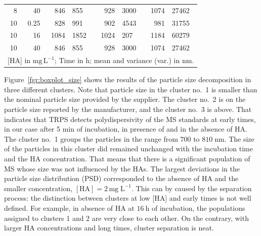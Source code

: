 \documentclass[journal=langd5,manuscript=article]{achemso}
\begin{document}
\begin{table}
\begin{tabular}{r r  
r@{$\;\pm$}l  
r@{$\;\pm$}l  
r@{$\;\pm$}l }
  8      &     40         &    846       & 855      &    928      &   3000      & 1074      &  27462     \\ 
  10     &      0.25      &    828       & 991      &    902      &   4543      & 981      &  31755     \\ 
  10     &     16         &   1084       & 1852      &   1024      &    207      & 1184      &  60279     \\ 
  10     &     40         &    846       & 855      &    928      &   3000      & 1074      &  27462     \\ 
\hline
\multicolumn{8}{l}{[HA] in $\mathrm{mg\,L^{-1}}$; Time in $\mathrm{h}$; mean and variance (var.) in $\mathrm{nm}$.} 
\end{tabular}
\end{table}



Figure~\ref{fgr:boxplot_size} shows the results of the particle size decomposition in three different clusters. Note that particle size in the cluster no.~1 is smaller than the nominal particle size provided by the supplier. 
The cluster no.~2 is on the particle size reported by the manufacturer, and the cluster no.~3 is above. That indicates that TRPS detects polydispersivity of the MS standards at early times, in our case after 5 min of incubation, in presence of  and in the absence of HA.
The cluster no.~1 groups the particles in the range from $700$ to $810\;\mathrm{nm}$. The size of the particles in this cluster did remained unchanged with the incubation time and the HA concentration. That means that there is a significant population of MS whose size was not influenced by the HAs. The largest deviations in the particle size distribution (PSD) corresponded to the absence of HA and the smaller concentration, $\mathrm{[HA]  = 2\,mg\;L^{-1}}$.
This can by caused by the separation process: the distinction between clusters at low [HA] and early times is not well defined. For example, in absence of HA at $16~\mathrm{h}$ of incubation, the populations assigned to clusters 1 and 2 are very close to each other. On the contrary, with larger HA concentrations and long  times, cluster separation is neat.
\end{document}
